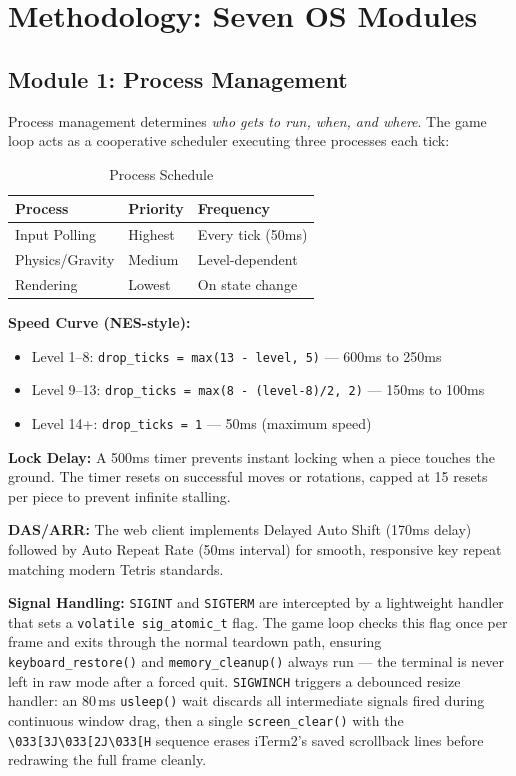 \documentclass[conference]{IEEEtran}
\begin{document}
\section{Methodology: Seven OS Modules}

\subsection{Module 1: Process Management}
Process management determines \textit{who gets to run, when, and where}. The game loop acts as a cooperative scheduler executing three processes each tick:

\begin{table}[H]
\centering
\caption{Process Schedule}
\begin{tabular}{lll}
\toprule
\textbf{Process} & \textbf{Priority} & \textbf{Frequency} \\
\midrule
Input Polling    & Highest & Every tick (50ms) \\
Physics/Gravity  & Medium  & Level-dependent   \\
Rendering        & Lowest  & On state change   \\
\bottomrule
\end{tabular}
\end{table}

\textbf{Speed Curve (NES-style):}
\begin{itemize}
  \item Level 1--8: \texttt{drop\_ticks = max(13 - level, 5)} --- 600ms to 250ms
  \item Level 9--13: \texttt{drop\_ticks = max(8 - (level-8)/2, 2)} --- 150ms to 100ms
  \item Level 14+: \texttt{drop\_ticks = 1} --- 50ms (maximum speed)
\end{itemize}

\textbf{Lock Delay:} A 500ms timer prevents instant locking when a piece touches the ground. The timer resets on successful moves or rotations, capped at 15 resets per piece to prevent infinite stalling.

\textbf{DAS/ARR:} The web client implements Delayed Auto Shift (170ms delay) followed by Auto Repeat Rate (50ms interval) for smooth, responsive key repeat matching modern Tetris standards.

\textbf{Signal Handling:} \texttt{SIGINT} and \texttt{SIGTERM} are intercepted by a lightweight handler that sets a \texttt{volatile sig\_atomic\_t} flag. The game loop checks this flag once per frame and exits through the normal teardown path, ensuring \texttt{keyboard\_restore()} and \texttt{memory\_cleanup()} always run --- the terminal is never left in raw mode after a forced quit. \texttt{SIGWINCH} triggers a debounced resize handler: an 80\,ms \texttt{usleep()} wait discards all intermediate signals fired during continuous window drag, then a single \texttt{screen\_clear()} with the \texttt{\textbackslash{}033[3J\textbackslash{}033[2J\textbackslash{}033[H} sequence erases iTerm2's saved scrollback lines before redrawing the full frame cleanly.
\end{document}
